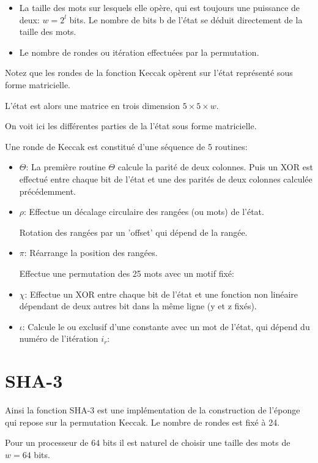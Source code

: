 \documentclass[10.5pt, a4paper, twoside, openright]{report}
\begin{document}
  \begin{itemize}
  \item{ La taille des mots sur lesquels elle opère, qui est toujours une puissance de deux: $w=2^l$ bits. Le nombre de bits b de l'état se déduit directement de la taille des mots.}
    \item{ Le nombre de rondes ou itération effectuées par la permutation.}
  \end{itemize}


Notez que les rondes de la fonction Keccak opèrent sur l'état représenté sous forme matricielle.

L'état est alors une matrice en trois dimension $5\times 5 \times w$.

On voit ici les différentes parties de la l'état sous forme matricielle.

Une ronde de Keccak est constitué d'une séquence de 5 routines:


\begin{itemize}
\item{$\Theta$:
La première routine $\Theta$ calcule la parité de deux colonnes.
Puis un XOR est effectué entre chaque bit de l'état et une des parités de deux colonnes calculée précédemment. 
}

\item{$\rho$: 
Effectue un décalage circulaire des rangées (ou mots) de l'état.

Rotation des rangées par un 'offset' qui dépend de la rangée.}
\item{$\pi$: 
 Réarrange la position des rangées.
 
 Effectue une permutation des 25 mots avec un motif fixé:}
\item{$\chi$: 
Effectue un XOR entre chaque bit de l'état et une fonction non linéaire dépendant de deux autres bit dans la même ligne (y et z fixés).
}
\item{$\iota$:
Calcule le ou exclusif d’une constante avec un mot de l’état, qui dépend du numéro de l’itération $i_r$:}
\end{itemize}

\section{SHA-3}
Ainsi la fonction SHA-3 est une implémentation de la construction de l'éponge qui repose sur la permutation Keccak.
Le nombre de rondes est fixé à 24.

Pour un processeur de $64$ bits il est naturel de choisir une taille des mots de $w=64$ bits.
\end{document}
